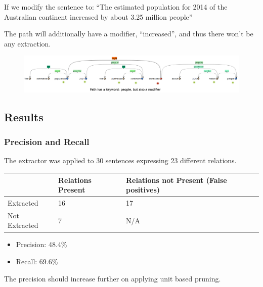 \documentclass[a4paper,10pt]{article}
\begin{document}
If we modify the sentence to:
``The estimated population for 2014 of the Australian continent	increased by about 3.25 million people''

The path will additionally have a modifier, ``increased'', and thus there won't be any extraction.
\begin{figure}[h]
 \centering
 \includegraphics[bb=0 0 1292 228,scale=0.3]{./dep_neg.png}
 \label{neg}
\end{figure}




\subsection{Results}
\subsubsection{Precision and Recall}
The extractor was applied to 30 sentences expressing 23 different relations.
\begin{tabular}{|l|l|l|}
\hline
& Relations Present & Relations not Present (False positives) \\
\hline
Extracted & 16 & 17 \\
\hline
Not Extracted & 7 & N/A \\
\hline
\end{tabular}
 \begin{itemize}
  \item Precision: 48.4\%
  \item Recall: 69.6\%
 \end{itemize}

The precision should increase further on applying unit based pruning.
\end{document}
